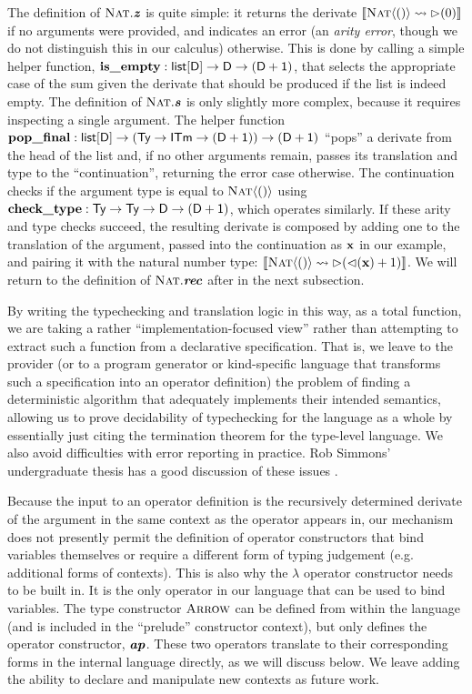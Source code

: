 The definition of $\fvar{Nat}.\opvar{z}$ is quite simple: it returns the derivate $\tden{\titerm{0}}{\ttype{Nat}{\tunit}}$ if no arguments were provided, and indicates an error (an \emph{arity error}, though we do not distinguish this in our calculus) otherwise. This is done by calling a simple helper function, $\tvar{is\_empty} : \karrow{\klist{\kDen}}{\karrow{\kDen}{(\ksum{\kDen}{\kunit})}}$, that selects the appropriate case of the sum given the derivate that should be produced if the list is indeed empty. The definition of $\fvar{Nat}.\opvar{s}$ is only slightly more complex, because it requires inspecting a single argument. The helper function $\tvar{pop\_final} : \karrow{\karrow{\klist{\kDen}}{(\karrow{\kTypeBlur}{\karrow{\kITerm}{(\ksum{\kDen}{\kunit})})}}}{(\ksum{\kDen}{\kunit})}$ ``pops'' a derivate from the head of the list and, if no other arguments remain, passes its translation and type to the ``continuation'', returning the error case otherwise. The continuation checks if the argument type is equal to $\ttype{Nat}{\tunit}$ using $\tvar{check\_type} : \karrow{\kTypeBlur}{\karrow{\kTypeBlur}{\karrow{\kDen}{(\ksum{\kDen}{\kunit})}}}$, which operates similarly. If these arity and type checks succeed, the resulting derivate is composed by adding one to the translation of the argument, passed into the continuation as $\tvar{x}$ in our example, and pairing it with the natural number type: $\tden{\titerm{\iup{\tvar{x}} + 1}}{\ttype{Nat}{\tunit}}$. We will return to the definition of $\fvar{Nat}.\opvar{rec}$ after in the next subsection.

By writing the typechecking and translation logic in this way, as a total function, we are taking a rather ``implementation-focused view'' rather than attempting to extract such a function from a declarative specification. That is,  we leave to the provider (or to a program generator or kind-specific language that transforms such a specification into an operator definition) the problem of finding a deterministic algorithm that adequately implements their intended semantics, allowing us to prove decidability of typechecking for the language as a whole by essentially just citing the termination theorem for the type-level language. We also avoid difficulties with error reporting in practice. Rob Simmons' undergraduate thesis has a good discussion of these issues \cite{rjs-princeton}.

Because the input to an operator definition is the recursively determined derivate of the argument in the same context as the operator appears in, our mechanism does not presently permit the definition of operator constructors that bind variables themselves or require a different form of typing judgement (e.g. additional forms of contexts). This is also why the $\lambda$ operator constructor needs to be built in. It is the only operator in our language that can be used to bind variables. The type constructor $\fvar{Arrow}$ can be defined from within the language (and is included in the ``prelude'' constructor context), but only defines the operator constructor, $\opvar{ap}$. These two operators translate to their corresponding forms in the internal language directly, as we will discuss below. We leave adding the ability to declare and manipulate new contexts as future work.

